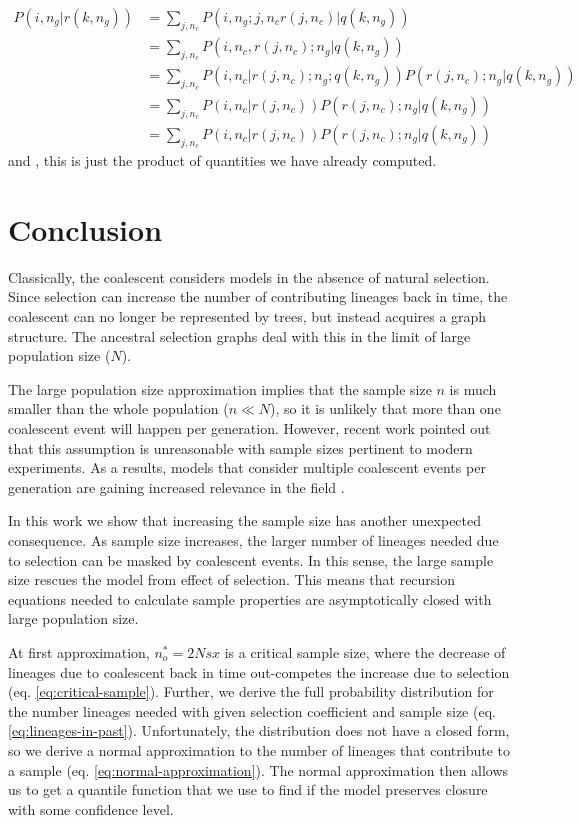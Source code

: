 \documentclass[review]{elsarticle}
\newcommand{\sgcomment}[1]{{\color{red}{SG: #1}}}
\begin{document}
 \begin{equation}
 \begin{split}
 P(i, n_g | r(k, n_g)) & = \sum_{j,n_c} P(i, n_g ; j, n_c r(j,n_c)  | q(k, n_g))\\
 &= \sum_{j,n_c} P(i, n_c,  r(j,n_c); n_g  | q(k, n_g))\\
 &= \sum_{j,n_c} P(i, n_c|   r(j,n_c); n_g  ; q(k, n_g))  P(r(j,n_c); n_g  | q(k, n_g))\\
 &= \sum_{j,n_c} P(i, n_c |   r(j,n_c))  P( r(j,n_c); n_g  | q(k, n_g))\\
 &= \sum_{j,n_c} P(i, n_c |   r(j,n_c))  P( r(j,n_c); n_g  | q(k, n_g))
 \end{split}
\end{equation}
and \sgcomment{despite the crap notation}, this is just the product of quantities we have already computed.


\section{Conclusion}
\label{sec:conclusion}

Classically, the coalescent considers models in the absence of natural selection. Since selection
can increase the number of contributing lineages back in time, the coalescent can no longer be
represented by trees, but instead acquires a graph structure. The ancestral selection graphs
\citep{KroneNeuhauser1997} deal with this in the limit of large population size ($N$).

The large population size approximation implies that the sample size $n$ is much smaller than the
whole population ($n \ll N$), so it is unlikely that more than one coalescent event will happen per
generation. However, recent work \citep{BhaskarEtAl2014,NelsonEtAl2019} pointed out that this
assumption is unreasonable with sample sizes pertinent to modern experiments. As a results, models
that consider multiple coalescent events per generation are gaining increased relevance in the
field \citep{FlemmingtonVoit}.

In this work we show that increasing the sample size has another unexpected consequence. As sample
size increases, the larger number of lineages needed due to selection can be masked by coalescent
events. In this sense, the large sample size rescues the model from effect of selection. This means
that recursion equations needed to calculate sample properties are asymptotically closed with large
population size.

At first approximation, $n_o^*=2Nsx$ is a critical sample size, where the decrease of lineages due to
coalescent back in time out-competes the increase due to selection (eq. \eqref{eq:critical-sample}).
Further, we derive the full probability distribution for the number lineages needed with given
selection coefficient and sample size (eq. \eqref{eq:lineages-in-past}). Unfortunately, the
distribution does not have a closed form, so we derive a normal approximation to the number of
lineages that contribute to a sample (eq. \eqref{eq:normal-approximation}). The normal approximation
then allows us to get a quantile function that we use to find if the model preserves closure with
some confidence level.
\end{document}
